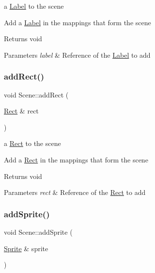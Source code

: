 a \hyperlink{class_label}{Label} to the scene

Add a \hyperlink{class_label}{Label} in the mappings that form the scene

\begin{DoxyReturn}{Returns}
void 
\end{DoxyReturn}

\begin{DoxyParams}{Parameters}
{\em label} & Reference of the \hyperlink{class_label}{Label} to add \\
\hline
\end{DoxyParams}
\mbox{\label{class_scene_a2ef42ab154353fa7881f9f7382f43b1f}} 
\subsubsection{\texorpdfstring{add\+Rect()}{addRect()}}
{\footnotesize\ttfamily void Scene\+::add\+Rect (\begin{DoxyParamCaption}\item[{\hyperlink{class_rect}{Rect} \&}]{rect }\end{DoxyParamCaption})}

a \hyperlink{class_rect}{Rect} to the scene

Add a \hyperlink{class_rect}{Rect} in the mappings that form the scene

\begin{DoxyReturn}{Returns}
void 
\end{DoxyReturn}

\begin{DoxyParams}{Parameters}
{\em rect} & Reference of the \hyperlink{class_rect}{Rect} to add \\
\hline
\end{DoxyParams}
\mbox{\label{class_scene_ac7bada9fa9ea8dbeee358693b44e540e}} 
\subsubsection{\texorpdfstring{add\+Sprite()}{addSprite()}}
{\footnotesize\ttfamily void Scene\+::add\+Sprite (\begin{DoxyParamCaption}\item[{\hyperlink{class_sprite}{Sprite} \&}]{sprite }\end{DoxyParamCaption})}

